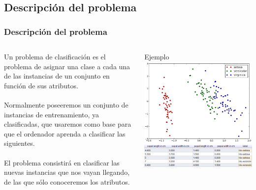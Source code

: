 \documentclass[8pt]{beamer}
\begin{document}
\subsection{Descripción del problema}
  \begin{frame}
    \frametitle{Descripción del problema}
    \begin{columns}[T]
    
     \begin{column}{.5\textwidth}
       \justifying
       Un problema de clasificación es el problema de asignar una clase a cada una de
       las instancias de un conjunto en función de sus atributos. 
       \\~\\
       Normalmente poseeremos un conjunto de instancias de entrenamiento, ya clasificadas, que
       usaremos como base para que el ordenador aprenda a clasificar las siguientes.
       \\~\\
       El problema consistirá en clasificar las nuevas instancias que nos vayan
       llegando, de las que sólo conoceremos los atributos.
     \end{column}
     
     \begin{column}{.5\textwidth}
      \begin{block}{Ejemplo}
       \includegraphics[width=\textwidth]{imgs/plot_iris.png} \\
       \includegraphics[width=\textwidth]{imgs/iris_dataset.png}
      \end{block}
     \end{column}
     
    \end{columns}

  \end{frame}
\end{document}
